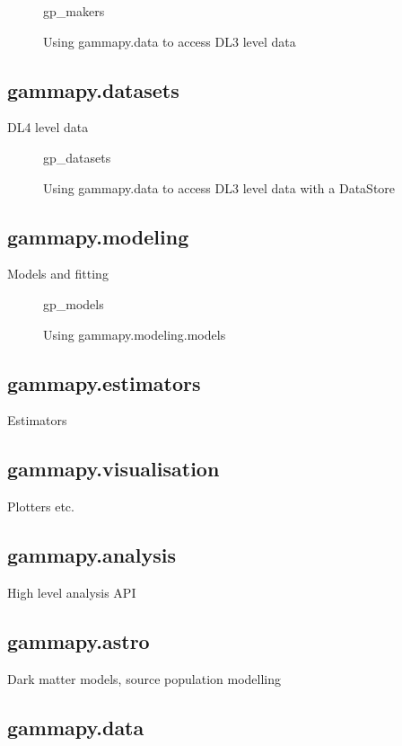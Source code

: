 \begin{figure}
{gp_makers}

\caption{Using gammapy.data to access DL3 level data}
\label{ig*:minted:gp_makers}
\end{figure}


\subsection{gammapy.datasets}
DL4 level data


\begin{figure}

{gp_datasets}
\caption{Using gammapy.data to access DL3 level data with a DataStore}
\label{fig*:minted:gp_datasets}
\end{figure}



\subsection{gammapy.modeling}
Models and fitting

\begin{figure}
{gp_models}
\caption{Using gammapy.modeling.models}
\label{fig*:minted:gp_models}
\end{figure}


\subsection{gammapy.estimators}
Estimators

\subsection{gammapy.visualisation}
Plotters etc.

\subsection{gammapy.analysis}
High level analysis API

\subsection{gammapy.astro}
Dark matter models, source population modelling

\subsection{gammapy.data}

